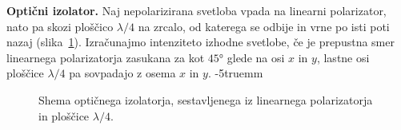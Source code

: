 \begin{example}{\bf Optični izolator.} 
\label{ex_izolator}
Naj nepolarizirana svetloba vpada na linearni polarizator, 
nato pa skozi ploščico $\lambda/4$ na zrcalo, od katerega
se odbije in vrne po isti poti nazaj (slika~\ref{fig:03_OpticniIzolator}). Izračunajmo intenziteto
izhodne svetlobe, če je prepustna smer linearnega polarizatorja
zasukana za kot $45\si{\degree}$ glede na osi $x$ in $y$, lastne
osi ploščice $\lambda/4$ pa sovpadajo z osema $x$ in $y$.
\vglue-5truemm
\begin{figure}[h!]
\centering
\def\svgwidth{100truemm} 

\caption{Shema optičnega izolatorja, sestavljenega iz 
linearnega polarizatorja in ploščice $\lambda/4$.}
\label{fig:03_OpticniIzolator}
\end{figure}


\end{example}

